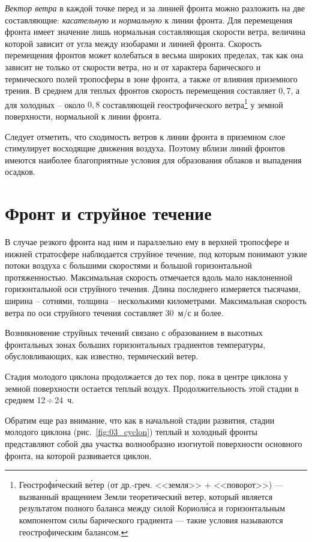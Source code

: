 \documentclass[a4paper, 12pt, twoside, final, book, russian, fittopage, cyremdash, openright]{ncc}
\newcommand{\mps}{~м/с\xspace}
\newcommand{\otdo}{\,\ensuremath{\div}\,}
\begin{document}
\textit{Вектор ветра} в каждой точке перед и за линией фронта можно
разложить на две составляющие: \textit{касательную} и
\textit{нормальную} к линии фронта. Для перемещения фронта имеет
значение лишь нормальная составляющая скорости ветра, величина которой
зависит от угла между изобарами и линией фронта. Скорость перемещения
фронтов может колебаться в весьма широких пределах, так как она
зависит не только от скорости ветра, но и от характера барического и
термического полей тропосферы в зоне фронта, а также от влияния
приземного трения. В среднем для теплых фронтов скорость перемещения
составляет $0,7$, а для холодных \--- около $0,8$ составляющей
геострофического ветра\footnote{Геостроф\'{и}ческий в\'{е}тер (от
  др.-греч. <<земля>> + <<поворот>>) — вызванный вращением Земли
  теоретический ветер, который является результатом полного баланса
  между силой Кориол\'{и}са и горизонтальным компонентом силы
  барического градиента — такие условия называются геострофическим
  балансом.}  у земной поверхности, нормальной к линии фронта.

Следует отметить, что сходимость ветров к линии фронта в приземном
слое стимулирует восходящие движения воздуха. Поэтому вблизи линий
фронтов имеются наиболее благоприятные условия для образования облаков
и выпадения осадков.

\section{Фронт и струйное течение}
\label{sec:front_and_stream}

В случае резкого фронта над ним и параллельно ему в верхней тропосфере
и нижней стратосфере наблюдается струйное течение, под которым
понимают узкие потоки воздуха с большими скоростями и большой
горизонтальной протяженностью. Максимальная скорость отмечается вдоль
мало наклоненной горизонтальной оси струйного течения. Длина
последнего измеряется тысячами, ширина \--- сотнями, толщина \---
несколькими километрами. Максимальная скорость ветра по оси струйного
течения составляет 30\mps{} и более.

Возникновение струйных течений связано с образованием в высотных
фронтальных зонах больших горизонтальных градиентов температуры,
обусловливающих, как известно, термический ветер.

Стадия молодого циклона продолжается до тех пор, пока в центре циклона
у земной поверхности остается теплый воздух. Продолжительность этой
стадии в среднем 12\otdo{}24~ч.

Обратим еще раз внимание, что как в начальной стадии развития, стадии
молодого циклона (рис.~\ref{fig:03_cyclon}) теплый и холодный фронты представляют собой два
участка волнообразно изогнутой поверхности основного фронта, на
которой развивается циклон.
\end{document}
